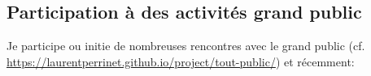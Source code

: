 \documentclass[10pt,french,a4paper,twoside]{article}%
\begin{document}
\begin{itemize}





\end{itemize} %
	

\subsection{Participation à des activités grand public} %

Je participe ou initie de nombreuses rencontres avec le grand public (cf. \url{https://laurentperrinet.github.io/project/tout-public/}) et récemment:
\end{document}

